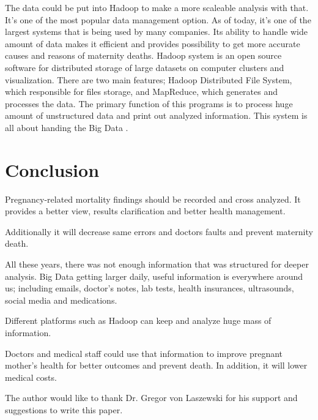 \documentclass[sigconf]{acmart}
\begin{document}
The data could be put into Hadoop to make a more scaleable analysis with that. It’s one of the most popular data management option. As of today, it's one of the largest systems that is being used by many companies. Its ability to handle wide amount of data makes it efficient and provides possibility to get more accurate causes and reasons of maternity deaths. Hadoop system is an open source software for distributed storage of large datasets on computer clusters and visualization. There are two main features;  Hadoop Distributed File System, which responsible for files storage, and MapReduce, which generates and processes the data. The primary function of this programs is to process huge amount of unstructured data and print out analyzed information. This system is all about handing the Big Data \cite{dittrich2012efficient}.

\section{Conclusion}

Pregnancy-related mortality findings should be recorded and cross analyzed. It provides a better view, results clarification and better health management. 

Additionally it will decrease same errors and doctors faults and prevent maternity death.

All these years, there was not enough information that was structured for deeper analysis. Big Data getting larger daily, useful information is everywhere around us; including emails, doctor’s notes, lab tests, health insurances, ultrasounds, social media and medications.

Different platforms such as Hadoop can keep and analyze huge mass of information.

Doctors and medical staff could use that information to improve pregnant mother’s health for better outcomes and prevent death. 
In addition, it will lower medical costs.


\begin{acks}

  The author would like to thank Dr. Gregor von Laszewski for his support and suggestions to write this paper.

\end{acks}


 
\end{document}
